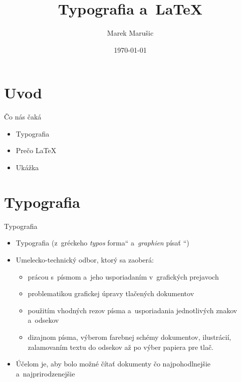 \documentclass{beamer}
\title[Your Short Title]{Typografia a~\LaTeX}
\author{Marek Marušic}
\institute{\textsc{Vysoké učení technické v~Brne \\
Fakulta Informačných Technologií}}
\date{\today}
\providecommand{\uv}[1]{\quotedblbase #1\textquotedblleft}
\begin{document}
\begin{frame}
  \titlepage
\end{frame}


\section{Uvod}

\begin{frame}{Čo nás čaká}

\begin{itemize}
  \item Typografia
  \item Prečo \LaTeX
  \item Ukážka
\end{itemize}



\end{frame}

\section{Typografia}

\begin{frame}{Typografia}

\begin{itemize}
\item Typografia (z~gréckeho \emph{typos} \uv{forma} a~\emph{graphien} \uv{písať })
\item Umelecko-technický odbor, ktorý sa zaoberá: 

\begin{itemize}

    \item prácou s~písmom a~jeho usporiadaním v~grafických prejavoch
    \item problematikou grafickej úpravy tlačených dokumentov
    \item použitím vhodných rezov písma a~usporiadania jednotlivých znakov a~odsekov
    \item dizajnom písma, výberom farebnej schémy dokumentov, ilustrácií, zalamovaním textu do odsekov až po výber papiera pre tlač.
\end{itemize}
  
\item Účelom je, aby bolo možné čítať dokumenty čo najpohodlnejšie a~najprirodzenejšie
\end{itemize}

\end{frame}
\end{document}
